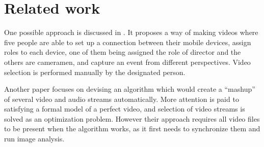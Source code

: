 \documentclass[conference]{IEEEtran}
\begin{document}
%


\section{Related work}

One possible approach is discussed in \cite{engstrom_mobile_2012}.
It proposes a way of making videos where five people are able to set up a connection between their mobile devices,
assign roles to each device, one of them being assigned the role of director and the others are cameramen,
and capture an event from different perspectives. Video selection is performed manually by the designated person.

Another paper \cite{shrestha_automatic_2010} focuses on devising an algorithm which would create 
a ``mashup'' of several video and audio streams automatically.
More attention is paid to satisfying a formal model of a perfect video, 
and selection of video streams is solved as an optimization problem.
However their approach requires all video files to be present when the algorithm works, 
as it first needs to synchronize them and run image analysis.
\end{document}
